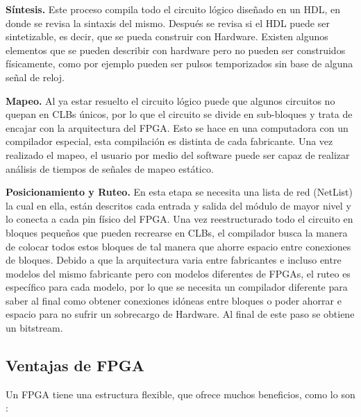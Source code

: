 \documentclass[twoside,spanish,ESP,MSc]{plantillaLabUPV}
\theoremstyle{definition}
\newcommand{\f}{FPGA }
\begin{document}

\checkmark\textbf{Síntesis.} Este proceso compila todo el circuito lógico diseñado en un HDL, en donde se revisa la sintaxis del mismo. Después se revisa si el HDL puede ser sintetizable, es decir, que se pueda construir con Hardware. Existen algunos elementos que se pueden describir con hardware pero no pueden ser construidos físicamente, como por ejemplo pueden ser pulsos temporizados sin base de alguna señal de reloj.

\checkmark\textbf{Mapeo.} Al ya estar resuelto el circuito lógico puede que algunos circuitos no quepan en CLBs únicos, por lo que el circuito se divide en sub-bloques y trata de encajar con la arquitectura del FPGA. Esto se hace en una computadora con un compilador especial, esta compilación es distinta de cada fabricante. Una vez realizado el mapeo, el usuario por medio del software puede ser capaz de realizar análisis de tiempos de señales de mapeo estático.

\checkmark\textbf{Posicionamiento y Ruteo.} En esta etapa se necesita una lista de red (NetList) la cual en ella, están descritos cada entrada y salida del módulo de mayor nivel y lo conecta a cada pin físico del FPGA.
Una vez reestructurado todo el circuito en bloques pequeños que pueden recrearse en CLBs, el compilador busca la manera de colocar todos estos bloques de tal manera que ahorre espacio entre conexiones de bloques. Debido a que la arquitectura varia entre fabricantes e incluso entre modelos del mismo fabricante pero con modelos diferentes de FPGAs, el ruteo es específico para cada modelo, por lo que se necesita un compilador diferente para saber al final como obtener conexiones idóneas entre bloques o poder ahorrar e espacio para no sufrir un sobrecargo de Hardware. Al final de este paso se obtiene un bitstream. %
%


\subsection{Ventajas de \f}
Un \f tiene una estructura flexible, que ofrece muchos beneficios, como lo son \cite{fpgarapid,fpgadesing}:
\end{document}
